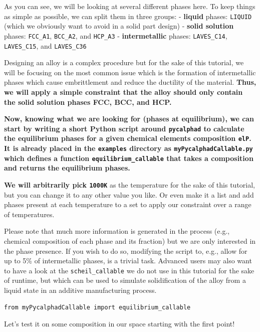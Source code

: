 As you can see, we will be looking at several different phases here. To
keep things as simple as possible, we can split them in three groups: -
\textbf{liquid} phases: \texttt{LIQUID} (which we
obviously want to avoid in a solid part design) - \textbf{solid
solution} phases: \texttt{FCC\_A1},
\texttt{BCC\_A2}, and \texttt{HCP\_A3}
- \textbf{intermetallic} phases: \texttt{LAVES\_C14},
\texttt{LAVES\_C15}, and
\texttt{LAVES\_C36}

Designing an alloy is a complex procedure but for the sake of this
tutorial, we will be focusing on the most common issue which is the
formation of intermetallic phases which cause embrittlement and reduce
the ductility of the material. \textbf{Thus, we will apply a simple
constraint that the alloy should only contain the solid solution phases
FCC, BCC, and HCP.}

\textbf{Now, knowing what we are looking for (phases at equilibrium), we
can start by writing a short Python script around
\texttt{pycalphad} to calculate the equilibrium phases
for a given chemical elements composition \texttt{elP}.
It is already placed in the \texttt{examples} directory
as \texttt{myPycalphadCallable.py} which defines a
function \texttt{equilibrium\_callable} that takes a
composition and returns the equilibrium phases.}

\textbf{We will arbitrarily pick \texttt{1000K}} as the
temperature for the sake of this tutorial, but you can change it to any
other value you like. Or even make it a list and add phases present at
each temperature to a set to apply our constraint over a range of
temperatures.

Please note that much more information is generated in the process
(e.g., chemical composition of each phase and its fraction) but we are
only interested in the phase presence. If you wish to do so, modifying
the script to, e.g., allow for up to 5\% of intermetallic phases, is a
trivial task. Advanced users may also want to have a look at the
\texttt{scheil\_callable} we do not use in this
tutorial for the sake of runtime, but which can be used to simulate
solidification of the alloy from a liquid state in an additive
manufacturing process.

\begin{verbatim}
from myPycalphadCallable import equilibrium_callable
\end{verbatim}

Let's test it on some composition in our space starting with the first
point!

